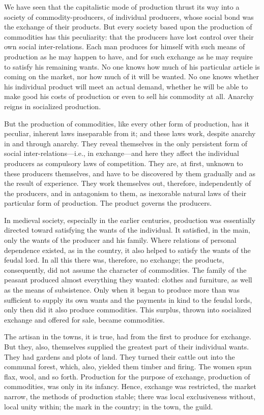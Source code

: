 We have seen that the capitalistic mode of production thrust its way into a
society of commodity-producers, of individual producers, whose social bond was
the exchange of their products. But every society based upon the production of
commodities has this peculiarity: that the producers have lost control over
their own social inter-relations. Each man produces for himself with such means
of production as he may happen to have, and for such exchange as he may require
to satisfy his remaining wants. No one knows how much of his particular article
is coming on the market, nor how much of it will be wanted. No one knows whether
his individual product will meet an actual demand, whether he will be able to
make good his costs of production or even to sell his commodity at all. Anarchy
reigns in socialized production.

But the production of commodities, like every other form of production, has it
peculiar, inherent laws inseparable from it; and these laws work, despite
anarchy in and through anarchy. They reveal themselves in the only persistent
form of social inter-relations---i.e., in exchange---and here they affect the
individual producers as compulsory laws of competition. They are, at first,
unknown to these producers themselves, and have to be discovered by them
gradually and as the result of experience. They work themselves out, therefore,
independently of the producers, and in antagonism to them, as inexorable natural
laws of their particular form of production. The product governs the producers.

In medieval society, especially in the earlier centuries, production was
essentially directed toward satisfying the wants of the individual. It
satisfied, in the main, only the wants of the producer and his family. Where
relations of personal dependence existed, as in the country, it also helped to
satisfy the wants of the feudal lord. In all this there was, therefore, no
exchange; the products, consequently, did not assume the character of
commodities. The family of the peasant produced almost everything they wanted:
clothes and furniture, as well as the means of subsistence. Only when it began
to produce more than was sufficient to supply its own wants and the payments in
kind to the feudal lords, only then did it also produce commodities. This
surplus, thrown into socialized exchange and offered for sale, became
commodities.

The artisan in the towns, it is true, had from the first to produce for
exchange. But they, also, themselves supplied the greatest part of their
individual wants. They had gardens and plots of land. They turned their cattle
out into the communal forest, which, also, yielded them timber and firing. The
women spun flax, wool, and so forth. Production for the purpose of exchange,
production of commodities, was only in its infancy. Hence, exchange was
restricted, the market narrow, the methods of production stable; there was local
exclusiveness without, local unity within; the mark in the country; in the town,
the guild.

